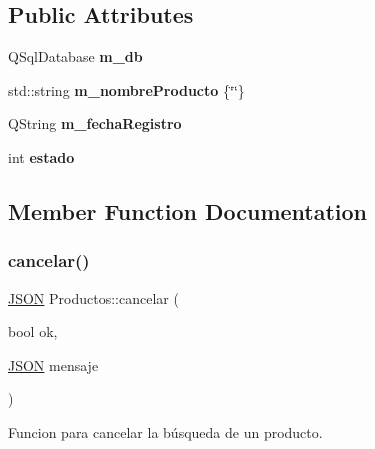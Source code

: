 \subsection*{Public Attributes}
\begin{DoxyCompactItemize}
\item 
\mbox{\label{classProductos_a154c164c166207d2a139262ea9a565e3}} 
Q\+Sql\+Database {\bfseries m\+\_\+db}
\item 
\mbox{\label{classProductos_ad07641725783d283cc9f28596b191781}} 
std\+::string {\bfseries m\+\_\+nombre\+Producto} \{\char`\"{}\char`\"{}\}
\item 
\mbox{\label{classProductos_a42a5ce5a82ca7441cb09f9526e1bf05c}} 
Q\+String {\bfseries m\+\_\+fecha\+Registro}
\item 
\mbox{\label{classProductos_a66bc7bb5d5c9416f67bedebf1a96bbe0}} 
int {\bfseries estado}
\end{DoxyCompactItemize}


\subsection{Member Function Documentation}
\mbox{\label{classProductos_a96ba61331dee6f46aa751df1e67c91a5}} 
\subsubsection{\texorpdfstring{cancelar()}{cancelar()}}
{\footnotesize\ttfamily \mbox{\hyperlink{classnlohmann_1_1basic__json}{J\+S\+ON}} Productos\+::cancelar (\begin{DoxyParamCaption}\item[{bool}]{ok,  }\item[{\mbox{\hyperlink{classnlohmann_1_1basic__json}{J\+S\+ON}}}]{mensaje }\end{DoxyParamCaption})}



Funcion para cancelar la búsqueda de un producto. 


